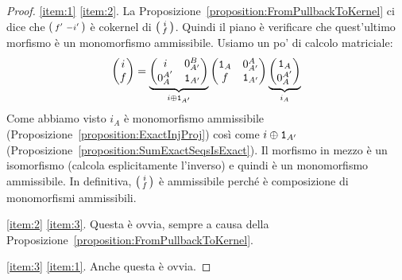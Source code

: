 \begin{proof}
  \ref{item:1} \Rightarrow \ref{item:2}. La
  Proposizione~\ref{proposition:FromPullbackToKernel} ci dice che
  \(\begin{psmallmatrix} f' & -i' \end{psmallmatrix}\) è cokernel di
  \(\begin{psmallmatrix} i \\ f \end{psmallmatrix}\). Quindi il piano è
  verificare che quest'ultimo morfismo è un monomorfismo
  ammissibile. Usiamo un po' di calcolo matriciale:
  \[
    \begin{pmatrix} i \\ f \end{pmatrix} = \underbrace{\begin{pmatrix} i
        & 0_{A'}^B \\ 0_A^{A'} & \id_{A'} \end{pmatrix}}_{i \oplus
      \id_{A'}}
    \begin{pmatrix} \id_A & 0_{A'}^A \\ f & \id_{A'} \end{pmatrix}
    \underbrace{\begin{pmatrix} \id_A \\
      0_A^{A'} \end{pmatrix}}_{i_A}
\]
Come abbiamo visto \(i_A\) è monomorfismo ammissibile
(Proposizione~\ref{proposition:ExactInjProj}) così come
\(i \oplus \mathtt 1_{A'}\)
(Proposizione~\ref{proposition:SumExactSeqsIsExact}). Il morfismo in
mezzo è un isomorfismo (calcola esplicitamente l'inverso) e quindi è un
monomorfismo ammissibile. In definitiva, \(\begin{psmallmatrix} i \\
  f \end{psmallmatrix}\) è ammissibile perché è composizione di
  monomorfismi ammissibili.

  \ref{item:2} \Rightarrow \ref{item:3}. Questa è ovvia, sempre a causa
  della Proposizione~\ref{proposition:FromPullbackToKernel}.

  \ref{item:3} \Rightarrow \ref{item:1}. Anche questa è ovvia.
  

\end{proof}
